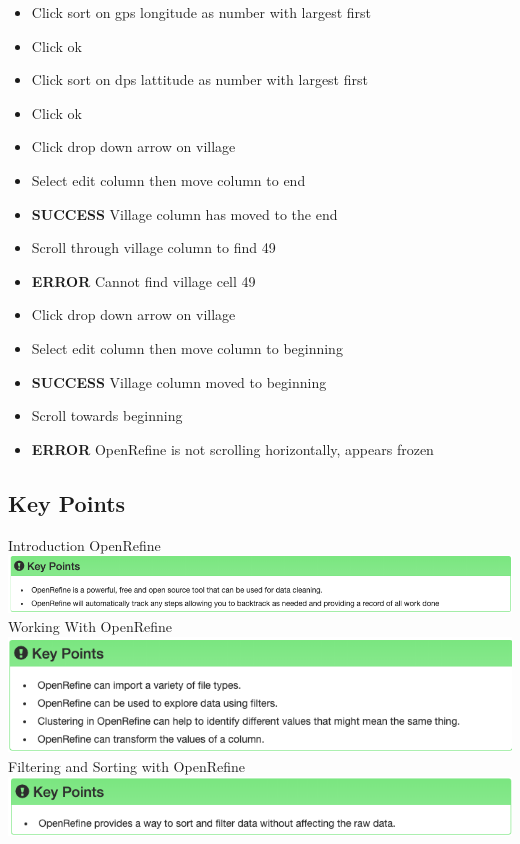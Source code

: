 \documentclass{article}
\begin{document}
\begin{itemize}
\item Click sort on gps longitude as number with largest first
\item Click ok
\item Click sort on dps lattitude as number with largest first
\item Click ok
\item Click drop down arrow on village
\item Select edit column then move column to end
\item \textbf{SUCCESS} Village column has moved to the end
\item Scroll through village column to find 49
\item \textbf{ERROR} Cannot find village cell 49
\item Click drop down arrow on village
\item Select edit column then move column to beginning
\item \textbf{SUCCESS} Village column moved to beginning
\item Scroll towards beginning
\item \textbf{ERROR} OpenRefine is not scrolling horizontally, appears frozen
\end{itemize}

\subsection{Key Points}
Introduction OpenRefine \\
\includegraphics[width=\textwidth]{Images/OpenRefine_1.png} \\
Working With OpenRefine \\
\includegraphics[width=\textwidth]{Images/OpenRefine_2.png}
Filtering and Sorting with OpenRefine \\
\includegraphics[width=\textwidth]{Images/OpenRefine_3.png}
\end{document}
